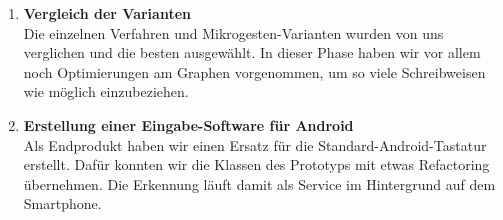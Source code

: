 \begin{enumerate}
\item  \textbf{Vergleich der Varianten} \\
Die einzelnen Verfahren und Mikrogesten-Varianten wurden von uns verglichen und die besten ausgewählt. In dieser Phase haben wir vor allem noch Optimierungen am Graphen vorgenommen, um so viele Schreibweisen wie möglich einzubeziehen.

\item \textbf{Erstellung einer Eingabe-Software für Android} \\
Als Endprodukt haben wir einen Ersatz für die Standard-Android-Tastatur erstellt. Dafür konnten wir die Klassen des Prototyps mit etwas Refactoring übernehmen. Die Erkennung läuft damit als Service im Hintergrund auf dem Smartphone. 

\end{enumerate}
